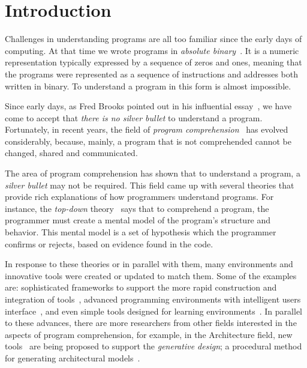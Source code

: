 
% 
% 

\section{Introduction}

Challenges in understanding programs are all too familiar since the early days of computing. At that time we wrote programs in \textit{absolute binary}~\cite{hamming2003art}. It is a numeric representation typically expressed by a sequence of zeros and ones, meaning that the programs were represented as a sequence of instructions and addresses both written in binary. To understand a program in this form is almost impossible.

Since early days, as Fred Brooks pointed out in his influential essay~\cite{bullet1987essence}, we have come to accept that \textit{there is no silver bullet} to understand a program. Fortunately, in recent years, the field of \textit{program comprehension}~\cite{rugaber1995program} has evolved considerably, because, mainly, a program that is not comprehended cannot be changed, shared and communicated.

The area of program comprehension has shown that to understand a program, a \textit{silver bullet} may not be required. This field came up with several theories that provide rich explanations of how programmers understand programs. For instance, the \textit{top-down} theory~\cite{brooks1977towards} says that to comprehend a program, the programmer must create a mental model of the program's structure and behavior. This mental model is a set of hypothesis which the programmer confirms or rejects, based on evidence found in the code.

In response to these theories or in parallel with them, many environments and innovative tools were created or updated to match them. Some of the examples are: sophisticated frameworks to support the more rapid construction and integration of tools~\cite{DesRivieres2004}, advanced programming environments with intelligent users interface~\cite{carlson2005eclipse,boudreau2002netbeans,intellij2001intellij,guckenheimer2006software}, and even simple tools designed for learning environments~\cite{papert1980mindstorms,Kay1993,Reas2006,findler2002drscheme,GuoSIGCSE2013,mcdirmid2013usable}. In parallel to these advances, there are more researchers from other fields interested in the aspects of program comprehension, for example, in the Architecture field, new tools~\cite{aish2012designscript,lopes2011portable} are being proposed to support the \textit{generative design}; a procedural method for generating architectural models~\cite{mccormack2004generative}.

